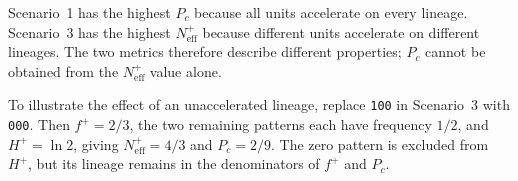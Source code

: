 \documentclass[11pt,a4paper]{article}
\begin{document}
Scenario~1 has the highest \(P_c\) because all units accelerate on every lineage. Scenario~3 has the highest \(N_{\mathrm{eff}}^{+}\) because different units accelerate on different lineages. The two metrics therefore describe different properties; \(P_c\) cannot be obtained from the \(N_{\mathrm{eff}}^{+}\) value alone.

To illustrate the effect of an unaccelerated lineage, replace \texttt{100} in Scenario~3 with \texttt{000}. Then \(f^{+}=2/3\), the two remaining patterns each have frequency \(1/2\), and \(H^{+}=\ln2\), giving \(N_{\mathrm{eff}}^{+}=4/3\) and \(P_c=2/9\). The zero pattern is excluded from \(H^{+}\), but its lineage remains in the denominators of \(f^{+}\) and \(P_c\).
\end{document}
